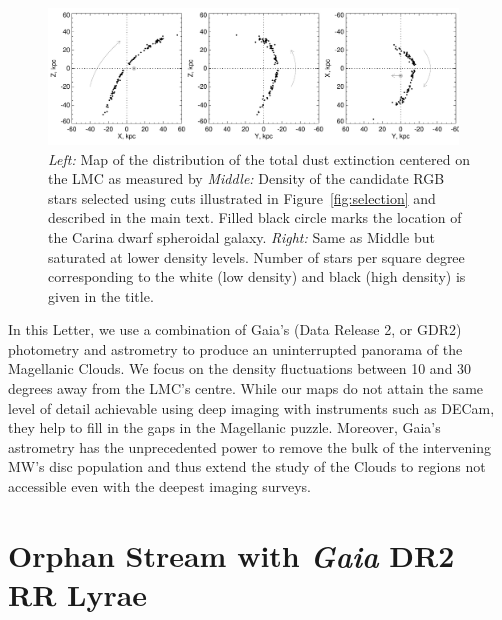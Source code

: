 \documentclass[a4paper,useAMS,usenatbib]{mnras}
\newcommand{\gaia}{\textit{Gaia} }
\begin{document}
%
\begin{figure}
  \centering
  \includegraphics[width=0.97\textwidth]{orphan_paper_xyz_members.pdf}
  \caption[]{ {\it Left:} Map of the distribution of the total dust
    extinction centered on the LMC as measured by \citet{SFD} {\it
      Middle:} Density of the candidate RGB stars selected using cuts
    illustrated in Figure~\ref{fig:selection} and described in the
    main text. Filled black circle marks the location of the Carina
    dwarf spheroidal galaxy. {\it Right:} Same as Middle but saturated
    at lower density levels. Number of stars per square degree
    corresponding to the white (low density) and black (high density)
    is given in the title.}
   \label{fig:map}
\end{figure}
%

In this Letter, we use a combination of Gaia's (Data Release 2, or
GDR2) photometry and astrometry to produce an uninterrupted panorama
of the Magellanic Clouds. We focus on the density fluctuations between
10 and 30 degrees away from the LMC's centre. While our maps do not
attain the same level of detail achievable using deep imaging with
instruments such as DECam, they help to fill in the gaps in the
Magellanic puzzle. Moreover, Gaia's astrometry has the
unprecedented power to remove the bulk of the intervening MW's
disc population and thus extend the study of the Clouds to regions
not accessible even with the deepest imaging surveys.


\section{Orphan Stream with \gaia DR2 RR Lyrae}
\end{document}
